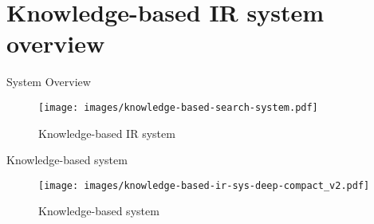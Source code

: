 \section{Knowledge-based IR system overview}

\begin{frame}{System Overview}
    
    \begin{figure} [H]
        \begin{center}
            \texttt{[image: images/knowledge-based-search-system.pdf]} 
            \caption{Knowledge-based IR system} 
        \end{center}
    \end{figure}
    
\end{frame}

\begin{frame}{Knowledge-based system}
    
    \begin{figure} [H]
        \begin{center}
            \texttt{[image: images/knowledge-based-ir-sys-deep-compact\_v2.pdf]} 
            \caption{Knowledge-based system} 
        \end{center}
    \end{figure}
    
\end{frame}